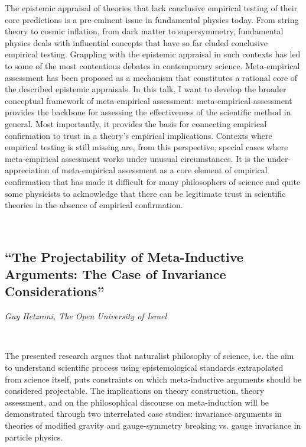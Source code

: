 \documentclass[11pt]{article}
\begin{document}
The epistemic appraisal of theories that lack conclusive empirical testing of their core predictions is a pre-eminent issue in fundamental physics today. From string theory to cosmic inflation, from dark matter to supersymmetry, fundamental physics deals with influential concepts that have so far eluded conclusive empirical testing. Grappling with the epistemic appraisal in such contexts has led to some of the most contentious debates in contemporary science.  Meta-empirical assessment has been proposed as a mechanism that constitutes a rational core of the described epistemic appraisals. In this talk, I want to develop the broader conceptual framework of meta-empirical assessment: meta-empirical assessment provides the backbone for assessing the effectiveness of the scientific method in general. Most importantly, it provides the basis for connecting empirical confirmation to trust in a theory’s empirical implications. Contexts where empirical testing is still missing are, from this perspective, special cases where meta-empirical assessment works under unusual circumstances. It is the under-appreciation of meta-empirical assessment as a core element of empirical confirmation that has made it difficult for many philosophers of science and quite some physicists to acknowledge that there can be legitimate trust in scientific theories in the absence of empirical confirmation.

\ 

\subsection*{\textsf{``The Projectability of
Meta-Inductive Arguments: The
Case of Invariance Considerations''}}

\textcolor{moderncvgreen}{
\textit{Guy Hetzroni, The Open University of Israel
}
}

\ 

The presented research argues that naturalist philosophy of science, i.e. the aim to understand scientific process using epistemological standards extrapolated from science itself, puts constraints on which meta-inductive arguments should be considered projectable. The implications on theory construction, theory assessment, and on the philosophical discourse on meta-induction will be demonstrated through two interrelated case studies: invariance arguments in theories of modified gravity and gauge-symmetry breaking vs. gauge invariance in particle physics.
\end{document}
